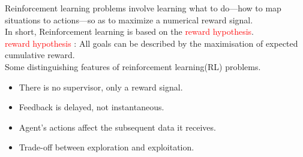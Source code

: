 \documentclass[landscape]{article}
\def\tcr{\textcolor{red}}
\def\tcb{\textcolor{blue}}
\begin{document}
\newpage
\newvgtitle{\tcb{The Reinforcement Learning Problem}}
\LARGE
\vspace{-.5em}
Reinforcement learning problems involve learning what to do—how to
map situations to actions—so as to maximize a numerical reward signal.\\
In short, Reinforcement learning is based on the \tcr{reward hypothesis}.\\
\tcr {reward hypothesis} : All goals can be described by the maximisation of expected
cumulative reward.\\
\vspace{0.5cm}
Some distinguishing features of reinforcement learning(RL) problems.
\begin{itemize}
    \item There is no supervisor, only a reward signal.
    \item Feedback is delayed, not instantaneous.
    \item Agent’s actions affect the subsequent data it receives.
    \item Trade-off between exploration and exploitation.
\end{itemize}
\end{document}
